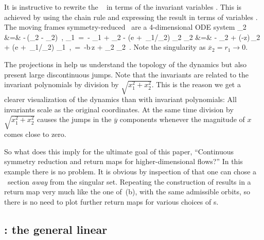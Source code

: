 \documentclass[final,number,sort&compress]{elsarticle}
\begin{document}
It is instructive to rewrite the \cLe~ in terms
of the invariant variables . This is
achieved by using the chain rule  and
expressing the result in terms of variables
. The moving frames symmetry-reduced \cLe\
are a 4-dimensional ODE system
\bea
	_2 &=& -\sigma \,(_2 - _2)
\,,\quad
	_1 \,=\, - _1 + \ImrCLor {}_2
  - \left(e + {\sigma\,_1}/{\overline{x}_2}\right) \overline{y}_2
\continue
	_2 &=&  - _2 + (\RerCLor-z)\,_2
   + \left(e + {\sigma\,_1}/{\overline{x}_2}\right) \overline{y}_1
\,,\quad
	\; \,=\, -b\,z + _2 _2
\,.
\label{eq:rdcdCLeR}
\eea
Note the singularity as $\overline{x}_2=r_1\rightarrow 0$.

The projections in  help us understand the
topology of the dynamics but also present large discontinuous jumps.
Note that the in\-vari\-ants \refeq{eq:invLaser} are related to
the in\-vari\-ant polynomials  by division by
$\sqrt{x_1^2+x_2^2}$. This is the reason we get a clearer
visualization of the dynamics than with in\-vari\-ant
polynomials: All in\-vari\-ants scale as the original
coordinates. At the same time division by
$\sqrt{x_1^2+x_2^2}$ causes the jumps in the $\overline{y}$
components whenever the magnitude of $x$ comes close to zero.


So what does this imply for the ultimate goal of this paper,
``Continuous symmetry reduction and return maps for
higher-dimensional flows?'' In this example there is no
problem. It is obvious by inspection of 
that one can chose a \Poincare\ section \emph{away} from the
singular set. Repeating the construction of
 results in a return map very much like
the one of \,(b), with the same admissible
orbits, so there is no need to plot further return maps for
various choices of \slice s.

\subsection{\label{s:mfReqb}\CLe: the general linear \slice}
\end{document}
